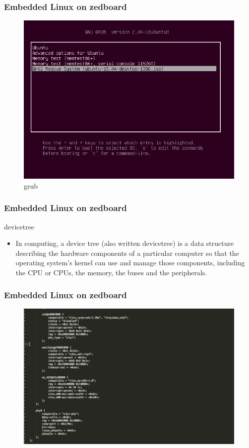 \documentclass{beamer}
\begin{document}
\begin{frame}
\frametitle{Embedded Linux on zedboard}
\begin{figure}
\centering\includegraphics[scale=0.35]{grub.png}
\caption{grub}
\end{figure}
\end{frame}

\begin{frame}
\frametitle{Embedded Linux on zedboard}
\centering devicetree\\
\begin{itemize}
	\item In computing, a device tree (also written devicetree) is a data structure describing the hardware components of a particular computer so that the operating system's kernel can use and manage those components, including the CPU or CPUs, the memory, the buses and the peripherals.
\end{itemize}
\end{frame}

\begin{frame}[fragile]
\frametitle{Embedded Linux on zedboard}
\begin{figure}
\centering\includegraphics[scale=0.3]{devicetree.png}
\end{figure}
\end{frame}
\end{document}
